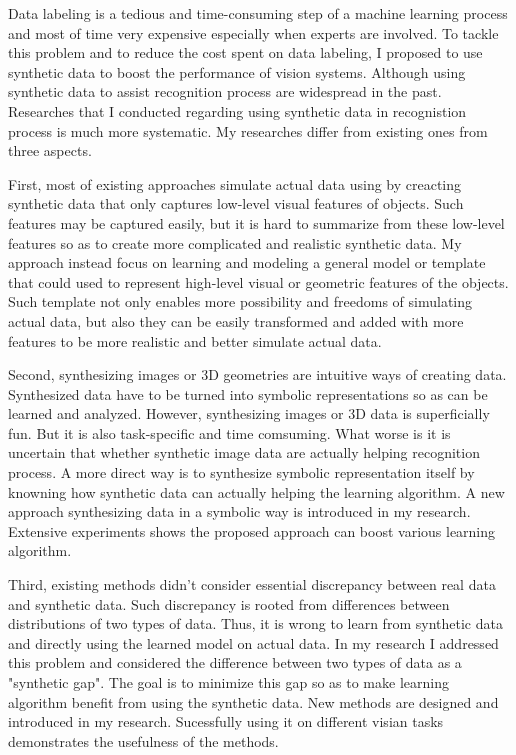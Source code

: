 \documentclass{iitthesis}
\begin{document}
 \label{sec: solution}

Data labeling is a tedious and time-consuming step of a machine learning process and most of time very expensive especially when experts are involved. To tackle this problem and to reduce the cost spent on data labeling, I proposed to use synthetic data to boost the performance of vision systems. Although using synthetic data to assist recognition process are widespread in the past. Researches that I conducted regarding using synthetic data in recognistion process is much more systematic. My researches differ from existing ones from three aspects.  

First, most of existing approaches simulate actual data using by creacting synthetic data that only captures low-level visual features of objects. Such features may be captured easily, but it is hard to summarize from these low-level features so as to create more complicated and realistic synthetic data. My approach instead focus on learning and modeling a general model or template that could used to represent high-level visual or geometric features of the objects. Such template not only enables more possibility and freedoms of simulating actual data, but also they can be easily transformed and added with more features to be more realistic and better simulate actual data. 

Second, synthesizing images or 3D geometries are intuitive ways of creating data. Synthesized data have to be turned into symbolic representations so as can be learned and analyzed. However, synthesizing images or 3D data is superficially fun. But it is also task-specific and time comsuming. What worse is it is uncertain that whether synthetic image data are actually helping recognition process. A more direct way is to synthesize symbolic representation itself by knowning how synthetic data can actually helping the learning algorithm. A new approach synthesizing data in a symbolic way is introduced in my research. Extensive experiments shows the proposed approach can boost various learning algorithm.

Third, existing methods didn't consider essential discrepancy between real data and synthetic data. Such discrepancy is rooted from differences between distributions of two types of data. Thus, it is wrong to learn from synthetic data and directly using the learned model on actual data. In my research I addressed this problem and considered the difference between two types of data as a "synthetic gap". The goal is to minimize this gap so as to make learning algorithm benefit from using the synthetic data. New methods are designed and introduced in my research. Sucessfully using it on different visian tasks demonstrates the usefulness of the methods.
\end{document}
